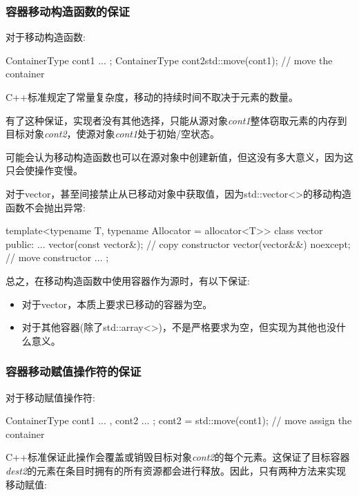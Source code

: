\subsubsection{容器移动构造函数的保证}

对于移动构造函数:

\begin{cppcode}
ContainerType cont1{ ... };
ContainerType cont2{std::move(cont1)}; // move the container
\end{cppcode}

C++标准规定了常量复杂度，移动的持续时间不取决于元素的数量。

有了这种保证，实现者没有其他选择，只能从源对象\textit{cont1}整体窃取元素的内存到目标对象\textit{cont2}，使源对象\textit{cont1}处于初始/空状态。

可能会认为移动构造函数也可以在源对象中创建新值，但这没有多大意义，因为这只会使操作变慢。

对于vector，甚至间接禁止从已移动对象中获取值，因为std::vector<>的移动构造函数不会抛出异常:

\begin{cppcode}
template<typename T, typename Allocator = allocator<T>>
class vector {
	public:
	...
	vector(const vector&); // copy constructor
	vector(vector&&) noexcept; // move constructor
	...
};
\end{cppcode}

总之，在移动构造函数中使用容器作为源时，有以下保证:

\begin{itemize}
	\item 对于vector，本质上要求已移动的容器为空。
	\item 对于其他容器(除了std::array<>)，不是严格要求为空，但实现为其他也没什么意义。
\end{itemize}

\subsubsection{容器移动赋值操作符的保证}

对于移动赋值操作符:

\begin{cppcode}
ContainerType cont1{ ... }, cont2{ ... };
cont2 = std::move(cont1); // move assign the container
\end{cppcode}

C++标准保证此操作会覆盖或销毁目标对象\textit{cont2}的每个元素。这保证了目标容器\textit{dest2}的元素在条目时拥有的所有资源都会进行释放。因此，只有两种方法来实现移动赋值:

